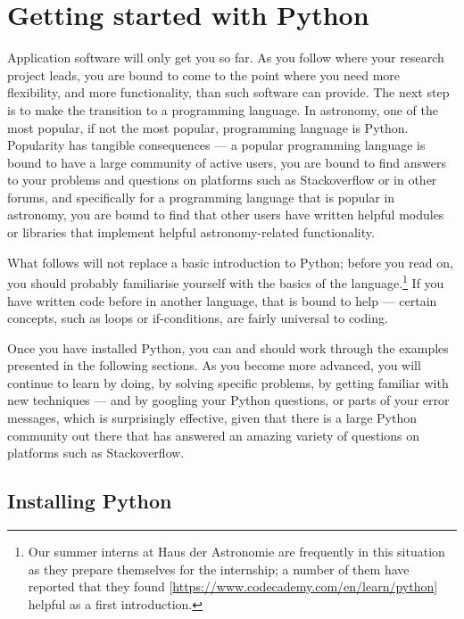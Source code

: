 \documentclass[twocolumn,apj]{openjournal}
\begin{document}

\section{Getting started with Python}

Application software will only get you so far. As you follow where your research project leads, you are bound to come to the point where you need more flexibility, and more functionality, than such software can provide. The next step is to make the transition to a programming language. In astronomy, one of the most popular, if not the most popular, programming language is Python. Popularity has tangible consequences --- a popular programming language is bound to have a large community of active users, you are bound to find answers to your problems and questions on platforms such as Stackoverflow or in other forums, and specifically for a programming language that is popular in astronomy, you are bound to find that other users have written helpful modules or libraries that implement helpful astronomy-related functionality.

What follows will not replace a basic introduction to Python; before you read on, you should probably familiarise yourself with the basics of the language.\footnote{Our summer interns at Haus der Astronomie are frequently in this situation as they prepare themselves for the internship; a number of them have reported that they found [\href{https://www.codecademy.com/en/learn/python}{https://www.codecademy.com/en/learn/python}] helpful as a first introduction.} If you have written code before in another language, that is bound to help --- certain concepts, such as loops or if-conditions, are fairly universal to coding.

Once you have installed Python, you can and should work through the examples presented in the following sections. As you become more advanced, you will continue to learn by doing, by solving specific problems, by getting familiar with new techniques --- and by googling your Python questions, or parts of your error messages, which is surprisingly effective, given that there is a large Python community out there that has answered an amazing variety of questions on platforms such as Stackoverflow.

\subsection{Installing Python}
\end{document}
